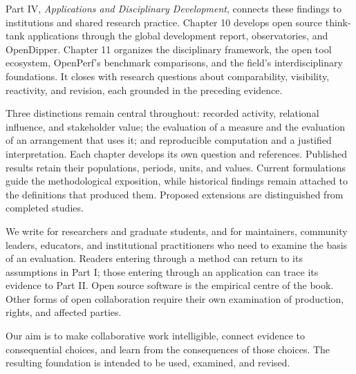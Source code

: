 Part IV, \emph{Applications and Disciplinary Development}, connects these findings to institutions and shared research practice. Chapter 10 develops open source think-tank applications through the global development report, observatories, and OpenDipper. Chapter 11 organizes the disciplinary framework, the open tool ecosystem, OpenPerf's benchmark comparisons, and the field's interdisciplinary foundations. It closes with research questions about comparability, visibility, reactivity, and revision, each grounded in the preceding evidence.

Three distinctions remain central throughout: recorded activity, relational influence, and stakeholder value; the evaluation of a measure and the evaluation of an arrangement that uses it; and reproducible computation and a justified interpretation. Each chapter develops its own question and references. Published results retain their populations, periods, units, and values. Current formulations guide the methodological exposition, while historical findings remain attached to the definitions that produced them. Proposed extensions are distinguished from completed studies.

We write for researchers and graduate students, and for maintainers, community leaders, educators, and institutional practitioners who need to examine the basis of an evaluation. Readers entering through a method can return to its assumptions in Part I; those entering through an application can trace its evidence to Part II. Open source software is the empirical centre of the book. Other forms of open collaboration require their own examination of production, rights, and affected parties.

Our aim is to make collaborative work intelligible, connect evidence to consequential choices, and learn from the consequences of those choices. The resulting foundation is intended to be used, examined, and revised.

\par\vspace{8pt}
{\raggedleft\sffamily\fontsize{10}{13}\selectfont\BookAuthors\par\BookDate\par}
\clearpage

